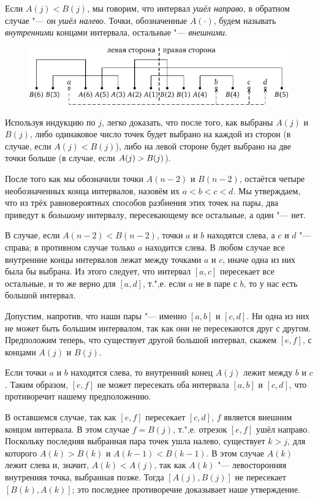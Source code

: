 \documentclass[twoside]{book}
\begin{document}
Если $A(j) < B(j)$, мы говорим, что интервал \emph{ушёл направо}, в обратном случае "--- он \emph{ушёл налево}.
Точки, обозначенные $A(\cdot )$, будем называть \emph{внутренними} концами интервала, остальные "--- \emph{внешними}.

\begin{figure}[!ht]
\centering
\includegraphics{mp/wink-5}
\end{figure} 

Используя индукцию по $j$, легко доказать, что после того, как выбраны $A(j)$ и $B(j)$, либо одинаковое число точек будет выбрано на каждой из сторон (в случае, если $A(j) < B(j)$), либо на левой стороне будет выбрано на две точки больше (в случае, если $A(j) \z> B(j)$).

После того как мы обозначили точки $A(n-2)$ и $B(n-2)$, остаётся четыре необозначенных конца интервалов, назовём их $a<b<c<d$.
Мы утверждаем, что из трёх равновероятных способов разбиения этих точек на пары, два приведут к \emph{большому} интервалу, пересекающему все остальные, а один "--- нет.

В случае, если $A(n-2) < B(n-2)$, точки $a$ и $b$ находятся слева, а $c$ и $d$ "--- справа;
в противном случае только $a$ находится слева.
В любом случае все внутренние концы интервалов лежат между точками $a$ и $c$, иначе одна из них была бы выбрана.
Из этого следует, что интервал $[a,c]$ пересекает все остальные, и то же верно для $[a,d]$, т.",е. если $a$ не в паре с $b$, то у нас есть большой интервал.

Допустим, напротив, что наши пары "--- именно $[a, b]$ и $[c, d]$.
Ни одна из них не может быть большим интервалом, так как они не пересекаются друг с другом.
Предположим теперь, что существует другой большой интервал, скажем $[e,f]$, с концами $A(j)$ и $B(j)$.

Если точки $a$ и $b$ находятся слева, то внутренний конец $A(j)$ лежит между $b$ и $c$.
Таким образом, $[e, f]$ не может пересекать оба интервала $[a, b]$ и $[c, d]$, что противоречит нашему предположению.

В оставшемся случае, так как $[e, f]$ пересекает $[c, d]$, $f$ является внешним концом интервала. 
В этом случае $f=B(j)$, т.",е. отрезок $[e, f]$ ушёл направо.
Поскольку последняя выбранная пара точек ушла налево, существует $k>j$, для которого $A(k)>B(k)$ и $A(k-1)<B(k-1)$.
В этом случае $A(k)$ лежит слева и, значит, $A(k) < A(j)$, так как $A(k)$ "--- левосторонняя внутренняя точка, выбранная позже. %
Тогда $[A(j), B(j)]$ не пересекает $[B(k), A(k)]$; это последнее противоречие доказывает наше утверждение.
\heart
\end{document}
